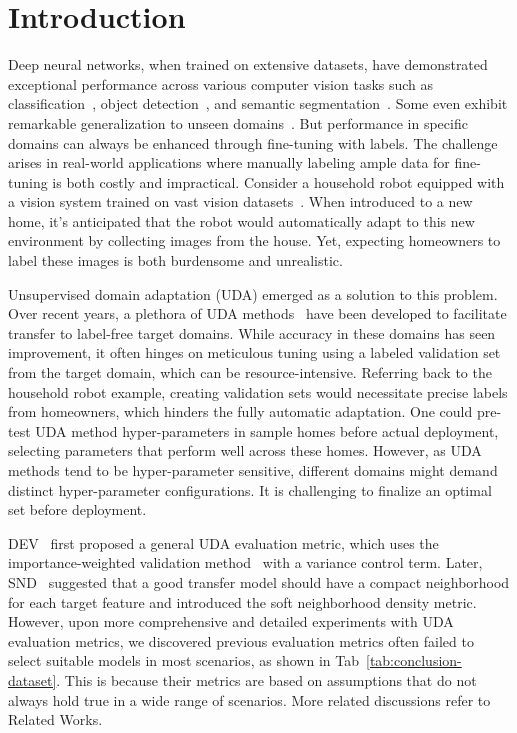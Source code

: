 \documentclass{article} %
\begin{document}
\section{Introduction}

Deep neural networks, when trained on extensive datasets, have demonstrated exceptional performance across various computer vision tasks such as classification~\cite{ConvNeXt, CLIP}, object detection~\cite{DETR, DINO}, and semantic segmentation~\cite{Deeplabv3+, SegFormer}. Some even exhibit remarkable generalization to unseen domains~\cite{ViLD, SEEM}. But performance in specific domains can always be enhanced through fine-tuning with labels. The challenge arises in real-world applications where manually labeling ample data for fine-tuning is both costly and impractical. Consider a household robot equipped with a vision system trained on vast vision datasets~\cite{RobotLifelong}. When introduced to a new home, it's anticipated that the robot would automatically adapt to this new environment by collecting images from the house. Yet, expecting homeowners to label these images is both burdensome and unrealistic.

Unsupervised domain adaptation (UDA) emerged as a solution to this problem. Over recent years, a plethora of UDA methods~\citep{CDAN,MCD,MDD,MCC,Proto} have been developed to facilitate transfer to label-free target domains. While accuracy in these domains has seen improvement, it often hinges on meticulous tuning using a labeled validation set from the target domain, which can be resource-intensive. Referring back to the household robot example, creating validation sets would necessitate precise labels from homeowners, which hinders the fully automatic adaptation. One could pre-test UDA method hyper-parameters in sample homes before actual deployment, selecting parameters that perform well across these homes. However, as UDA methods tend to be hyper-parameter sensitive, different domains might demand distinct hyper-parameter configurations. It is challenging to finalize an optimal set before deployment.

DEV~\cite{DEV} first proposed a general UDA evaluation metric, which uses the importance-weighted validation method~\cite{IWV} with a variance control term. Later, SND~\cite{SND} suggested that a good transfer model should have a compact neighborhood for each target feature and introduced the soft neighborhood density metric. However, upon more comprehensive and detailed experiments with UDA evaluation metrics, we discovered previous evaluation metrics often failed to select suitable models in most scenarios, as shown in Tab~\ref{tab:conclusion-dataset}. 
This is because their metrics are based on assumptions that do not always hold true in a wide range of scenarios. More related discussions refer to Related Works.
\end{document}
